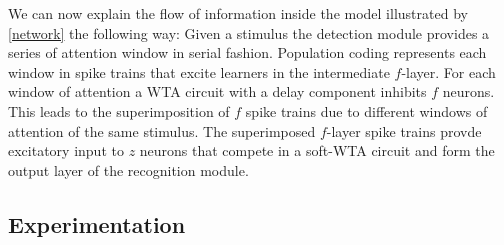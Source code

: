 \documentclass{report}
\begin{document}
We can now explain the flow of information inside the model illustrated by \cref{network} the following way: Given a stimulus the detection module provides a series of attention window in serial fashion. Population coding represents each window in spike trains that excite learners in the intermediate $f$-layer. For each window of attention a WTA circuit with a delay component inhibits $f$ neurons. This leads to the superimposition of $f$ spike trains due to different windows of attention of the same stimulus. The superimposed $f$-layer spike trains provde excitatory input to $z$ neurons that compete in a soft-WTA circuit and form the output layer of the recognition module.

\subsection{Experimentation}
\end{document}
